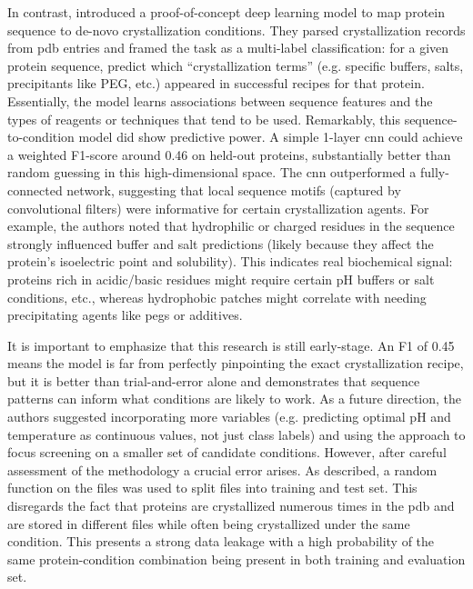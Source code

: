 In contrast, \citet{Lee2019} introduced a proof-of-concept deep learning model to map protein sequence to de-novo crystallization conditions. They parsed crystallization records from \gls{pdb} entries and framed the task as a multi-label classification: for a given protein sequence, predict which “crystallization terms” (e.g. specific buffers, salts, precipitants like PEG, etc.) appeared in successful recipes for that protein. Essentially, the model learns associations between sequence features and the types of reagents or techniques that tend to be used. Remarkably, this sequence-to-condition model did show predictive power. A simple 1-layer \gls{cnn} could achieve a weighted F1-score around 0.46 on held-out proteins, substantially better than random guessing in this high-dimensional space. The \gls{cnn} outperformed a fully-connected network, suggesting that local sequence motifs (captured by convolutional filters) were informative for certain crystallization agents. For example, the authors noted that hydrophilic or charged residues in the sequence strongly influenced buffer and salt predictions (likely because they affect the protein’s isoelectric point and solubility). This indicates real biochemical signal: proteins rich in acidic/basic residues might require certain pH buffers or salt conditions, etc., whereas hydrophobic patches might correlate with needing precipitating agents like \glspl{peg} or additives.

It is important to emphasize that this research is still early-stage. An F1 of 0.45 means the model is far from perfectly pinpointing the exact crystallization recipe, but it is better than trial-and-error alone and demonstrates that sequence patterns can inform what conditions are likely to work. As a future direction, the authors suggested incorporating more variables (e.g. predicting optimal pH and temperature as continuous values, not just class labels) and using the approach to focus screening on a smaller set of candidate conditions. However, after careful assessment of the methodology a crucial error arises. As described, a random function on the files was used to split files into training and test set. This disregards the fact that proteins are crystallized numerous times in the \gls{pdb} and are stored in different files while often being crystallized under the same condition. This presents a strong data leakage with a high probability of the same protein-condition combination being present in both training and evaluation set.

% 
